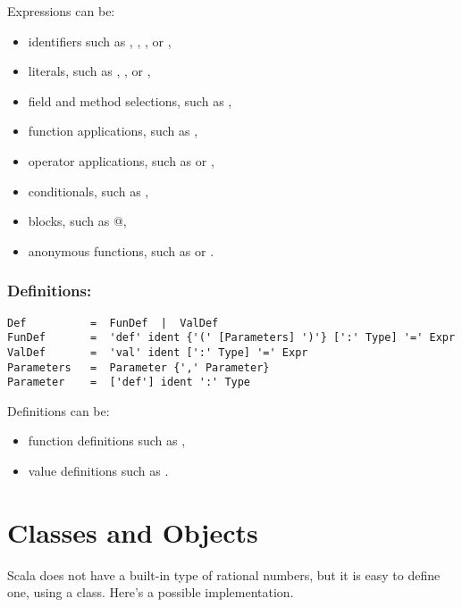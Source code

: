 \documentclass[a4paper,12pt,twoside,titlepage]{book}
\begin{document}
Expressions can be:
\begin{itemize}
\item
identifiers such as , , \code{*}, or \code{+-},
\item
literals, such as , , or ,
\item
field and method selections, such as ,
\item
function applications, such as , 
\item
operator applications, such as  or ,
\item
conditionals, such as ,
\item
blocks, such as @,
\item
anonymous functions, such as  or .
\end{itemize}

\subsection*{Definitions:}

\begin{lstlisting}
Def          =  FunDef  |  ValDef
FunDef       =  'def' ident {'(' [Parameters] ')'} [':' Type] '=' Expr
ValDef       =  'val' ident [':' Type] '=' Expr
Parameters   =  Parameter {',' Parameter}
Parameter    =  ['def'] ident ':' Type
\end{lstlisting}
Definitions can be:
\begin{itemize}
\item
function definitions such as , 
\item
value definitions such as .
\end{itemize}

\chapter{Classes and Objects}
\label{chap:classes}

Scala does not have a built-in type of rational numbers, but it is
easy to define one, using a class. Here's a possible implementation.
\end{document}
